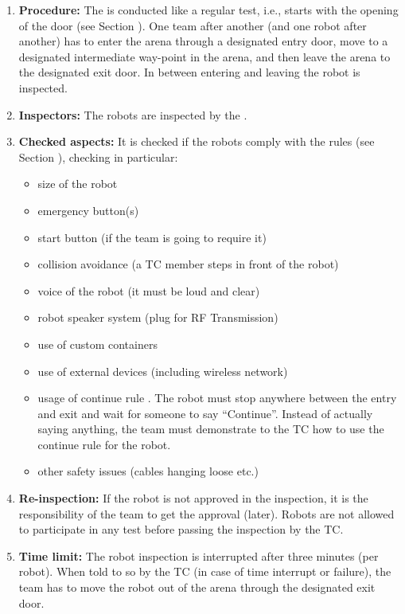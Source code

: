 \begin{enumerate}
	\item \textbf{Procedure:} The  is conducted like a regular test, i.e., starts with the opening of the door (see Section ). One team after another (and one robot after another) has to enter the arena through a designated entry door, move to a designated intermediate way-point in the arena, and then leave the arena to the designated exit door. In between entering and leaving the robot is inspected.
	\item \textbf{Inspectors:} The robots are inspected by the .
	\item \textbf{Checked aspects:} It is checked if the robots comply with the rules (see Section ), checking in particular:
	\begin{itemize}
		\item size of the robot
		\item emergency button(s)
		\item start button (if the team is going to require it)
		\item collision avoidance (a TC member steps in front of the robot)
		\item voice of the robot (it must be loud and clear)
		\item robot speaker system (plug for RF Transmission)
		\item use of custom containers 
		\item use of external devices (including wireless network)
		\item usage of continue rule \label{rule:asrcontinue}. The robot must stop anywhere between the entry and exit and wait for someone to say ``Continue''. Instead of actually saying anything, the team must demonstrate to the TC how to use the continue rule for the robot. 
		\item other safety issues (cables hanging loose etc.)
	\end{itemize}
	\item \textbf{Re-inspection:} If the robot is not approved in the inspection, it is the responsibility of the team to get the approval (later). Robots are not allowed to participate in any test before passing the inspection by the TC.
	\item \textbf{Time limit:} The robot inspection is interrupted after three minutes (per robot). When told to so by the TC (in case of time interrupt or failure), the team has to move the robot out of the arena through the designated exit door.

\end{enumerate}
